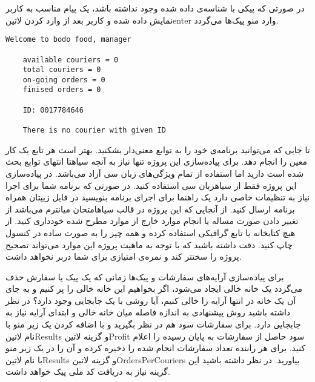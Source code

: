 \documentclass[../main.tex]{subfiles}
\begin{document}
در صورتی که پیکی با شناسه‌ی داده شده وجود نداشته باشد، یک پیام مناسب به کاربر نمایش داده شده و کاربر بعد از وارد کردن ‌لاتین{enter} وارد منو پیک‌ها می‌گردد.

\begin{latin}
\begin{lstlisting}[]
    Welcome to bodo food, manager

    available couriers = 0
    total couriers = 0
    on-going orders = 0
    finised orders = 0

    ID: 0017784646

    There is no courier with given ID
\end{lstlisting}
\end{latin}


     تا جایی که می‌توانید برنامه‌ی خود را به توابع معنی‌دار بشکنید. بهتر است هر تابع یک کار معین را انجام دهد.
     برای پیاده‌سازی این پروژه تنها نیاز به آنچه ‌سیاه{تا انتهای توابع} بحث شده است دارید اما استفاده از تمام ویژگی‌های زبان سی آزاد می‌باشد.
     در پیاده‌سازی این پروژه فقط از ‌سیاه{زبان سی} استفاده کنید. در صورتی که برنامه شما برای اجرا نیاز به تنظیمات خاصی دارد یک راهنما برای اجرای برنامه بنویسید در فایل زیپتان همراه برنامه ارسال کنید.
     از آنجایی که این پروژه در قالب ‌سیاه{امتحان میانترم} می‌باشد از تغییر دادن صورت مساله یا انجام موارد خارج از موارد مطرح شده خودداری کنید.
     از هیچ کتابخانه یا تابع گرافیکی استفاده کرده و همه چیز را به صورت ساده در کنسول چاپ کنید. دقت داشته باشید که با توجه به ماهیت پروژه این موارد می‌تواند تصحیح پروژه را سختتر کند و نمره‌ی امتیازی برای شما دربر نخواهد داشت.


     برای پیاده‌سازی آرایه‌های سفارشات و پیک‌ها زمانی که یک پیک یا سفارش حذف می‌گردد یک خانه خالی ایجاد می‌شود، اگر بخواهیم این خانه خالی را پر کنیم و به جای آن یک خانه در انتها آرایه را خالی کنیم، آیا روشی با یک جابجایی وجود دارد؟ در نظر داشته باشید روش پیشنهادی به اندازه فاصله میان خانه خالی و ابتدای آرایه نیاز به جابجایی دارد.
     برای سفارشات سود هم در نظر بگیرید و با اضافه کردن یک زیر منو با نام ‌لاتین{Results} و گزینه ‌لاتین{Profit} سود حاصل از سفارشات به پایان رسیده را اعلام کنید.
     برای هر راننده تعداد سفارشات انجام شده را ذخیره کرده و آن را در یک زیر منو با نام ‌لاتین{Results} و گزینه ‌لاتین{OrdersPerCouriers} بیاورید. در نظر داشته باشید این گزینه نیاز به دریافت کد ملی پیک خواهد داشت.
\end{document}
